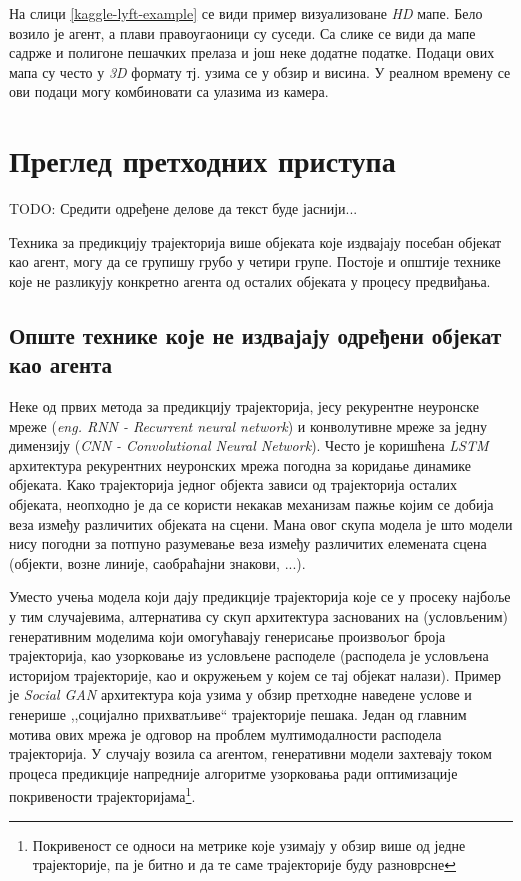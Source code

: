 \documentclass[11pt,oneside]{memoir}
\begin{document}
На слици \ref{kaggle-lyft-example} се види пример визуализоване \textit{HD} мапе. Бело возило је агент, а плави правоугаоници су суседи. 
Са слике се види да мапе садрже и полигоне пешачких прелаза и још неке додатне податке. Подаци ових мапа су често у \textit{3D} формату
тј. узима се у обзир и висина. У реалном времену се ови подаци могу комбиновати са улазима из камера. 

\chapter{Преглед претходних приступа}
\label{chp:razrada}

TODO: Средити одређене делове да текст буде јаснији...

Техника за предикцију трајекторија више објеката које издвајају посебан објекат као агент, могу да се групишу грубо у четири групе. Постоје
и општије технике које не разликују конкретно агента од осталих објеката у процесу предвиђања.

\section{Опште технике које не издвајају одређени објекат као агента}

Неке од првих метода за предикцију трајекторија, јесу рекурентне неуронске мреже 
(\textit{eng. RNN - Recurrent neural network}) и конволутивне мреже за једну димензију (\textit{CNN - Convolutional Neural Network}). 
Често је коришћена \textit{LSTM} архитектура рекурентних неуронских мрежа погодна за коридање динамике објеката. 
Како трајекторија једног објекта зависи од трајекторија осталих објеката,
неопходно је да се користи некакав механизам пажње којим се добија веза између различитих објеката на сцени. \cite{argoverse} \cite{social_lstm} 
Мана овог скупа модела је што модели нису погодни за потпуно разумевање веза између различитих елемената сцена (објекти, возне линије, саобраћајни знакови, ...).

Уместо учења модела који дају предикције трајекторија које се у просеку најбоље у тим случајевима, 
алтернатива су скуп архитектура заснованих на (условљеним) генеративним моделима који
омогућавају генерисање произвољог броја трајекторија, као узорковање из условљене расподеле (расподела је условљена историјом трајекторије, као и
окружењем у којем се тај објекат налази). Пример је \textit{Social GAN} \cite{social_gan} архитектура која узима у обзир претходне наведене услове и генерише ,,социјално прихватљиве`` трајекторије
пешака. Један од главним мотива ових мрежа је одговор на проблем мултимодалности расподела трајекторија. 
У случају возила са агентом, генеративни модели захтевају током процеса предикције напредније алгоритме узорковања ради оптимизације покривености
трајекторијама\footnote{Покривеност се односи на метрике које узимају у обзир више од једне трајекторије, па је битно и да те
саме трајекторије буду разноврсне}.
\end{document}
